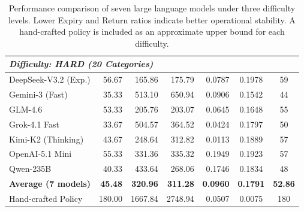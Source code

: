 \begin{table}[t]
{\begin{tabular}{lrrrrcc}
    \multicolumn{7}{l}{\cellcolor{gray!20}\textit{Difficulty: HARD (20 Categories)}} \\
    \midrule
    DeepSeek-V3.2 (Exp.) & 56.67 & 165.86 & 175.79 & 0.0787 & 0.1978 & 59 \\
    Gemini-3 (Fast)      & 35.33 & 513.10 & 650.94 & 0.0906 & 0.1542 & 44 \\
    GLM-4.6              & 53.33 & 205.76 & 203.07 & 0.0645 & 0.1648 & 55 \\
    Grok-4.1 Fast        & 33.67 & 504.57 & 364.52 & 0.0424 & 0.1797 & 50 \\
    Kimi-K2 (Thinking)   & 43.67 & 248.64 & 312.82 & 0.0113 & 0.1889 & 57 \\
    OpenAI-5.1 Mini      & 55.33 & 331.36 & 335.32 & 0.1949 & 0.1923 & 57 \\
    Qwen-235B            & 40.33 & 433.64 & 268.06 & 0.1746 & 0.1834 & 48 \\
    \midrule
    \textbf{Average (7 models)} 
        & \textbf{45.48} 
        & \textbf{320.96} 
        & \textbf{311.28} 
        & \textbf{0.0960} 
        & \textbf{0.1791} 
        & \textbf{52.86} \\
    \midrule
    Hand-crafted Policy & 180.00 & 1667.84 & 2748.94 & 0.0507 & 0.0075 & 180 \\

    \bottomrule
    \end{tabular}
    }
    \caption{
    Performance comparison of seven large language models under three difficulty levels.
    Lower Expiry and Return ratios indicate better operational stability.
    A hand-crafted policy is included as an approximate upper bound for each difficulty.
    }
    \label{tab:three_difficulty_flat}
    \vspace{-5mm}
\end{table}